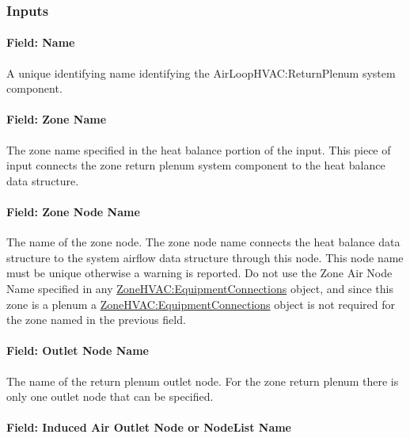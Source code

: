 \subsubsection{Inputs}\label{inputs-2-003}

\paragraph{Field: Name}\label{field-name-2-002}

A unique identifying name identifying the AirLoopHVAC:ReturnPlenum system component.

\paragraph{Field: Zone Name}\label{field-zone-name-000}

The zone name specified in the heat balance portion of the input. This piece of input connects the zone return plenum system component to the heat balance data structure.

\paragraph{Field: Zone Node Name}\label{field-zone-node-name}

The name of the zone node. The zone node name connects the heat balance data structure to the system airflow data structure through this node. This node name must be unique otherwise a warning is reported. Do not use the Zone Air Node Name specified in any \hyperref[zonehvacequipmentconnections]{ZoneHVAC:EquipmentConnections} object, and since this zone is a plenum a \hyperref[zonehvacequipmentconnections]{ZoneHVAC:EquipmentConnections} object is not required for the zone named in the previous field.

\paragraph{Field: Outlet Node Name}\label{field-outlet-node-name-000}

The name of the return plenum outlet node. For the zone return plenum there is only one outlet node that can be specified.

\paragraph{Field: Induced Air Outlet Node or NodeList Name}\label{field-induced-air-outlet-node-or-nodelist-name}

